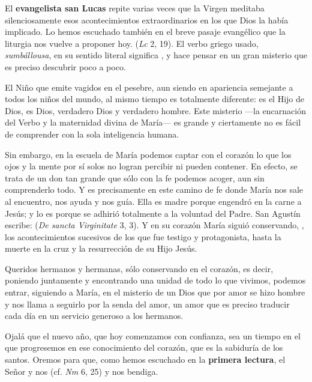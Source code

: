 \begin{body}
\begin{body}
{El \textbf{evangelista san Lucas} repite varias veces que la Virgen meditaba silenciosamente esos acontecimientos extraordinarios en los que Dios la había implicado. Lo hemos escuchado también en el breve pasaje evangélico que la liturgia nos vuelve a proponer hoy.  (\emph{Lc} 2, 19). El verbo griego usado, \emph{sumbállousa}, en su sentido literal significa , y hace pensar en un gran misterio que es preciso descubrir poco a poco.

El Niño que emite vagidos en el pesebre, aun siendo en apariencia semejante a todos los niños del mundo, al mismo tiempo es totalmente diferente: es el Hijo de Dios, es Dios, verdadero Dios y verdadero hombre. Este misterio ---la encarnación del Verbo y la maternidad divina de María--- es grande y ciertamente no es fácil de comprender con la sola inteligencia humana.

Sin embargo, en la escuela de María podemos captar con el corazón lo que los ojos y la mente por sí solos no logran percibir ni pueden contener. En efecto, se trata de un don tan grande que sólo con la fe podemos acoger, aun sin comprenderlo todo. Y es precisamente en este camino de fe donde María nos sale al encuentro, nos ayuda y nos guía. Ella es madre porque engendró en la carne a Jesús; y lo es porque se adhirió totalmente a la voluntad del Padre. San Agustín escribe:  (\emph{De sancta Virginitate} 3, 3). Y en su corazón María siguió conservando, , los acontecimientos sucesivos de los que fue testigo y protagonista, hasta la muerte en la cruz y la resurrección de su Hijo Jesús.

Queridos hermanos y hermanas, sólo conservando en el corazón, es decir, poniendo juntamente y encontrando una unidad de todo lo que vivimos, podemos entrar, siguiendo a María, en el misterio de un Dios que por amor se hizo hombre y nos llama a seguirlo por la senda del amor, un amor que es preciso traducir cada día en un servicio generoso a los hermanos.

Ojalá que el nuevo año, que hoy comenzamos con confianza, sea un tiempo en el que progresemos en ese conocimiento del corazón, que es la sabiduría de los santos. Oremos para que, como hemos escuchado en la \textbf{primera lectura}, el Señor  y nos  (cf. \emph{Nm} 6, 25) y nos bendiga.

}
\end{body}
\end{body}
